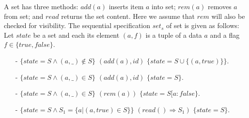 \begin{example}
\label{definition:sequential specification of set}
A set has three methods: $\mathit{add}(a)$ inserts item $a$ into set;
$\mathit{rem}(a)$ removes $a$ from set; and $\mathit{read}$ returns
the set content.
Here we assume that $\mathit{rem}$ will also be checked for
visibility.
The sequential specification $\mathit{set}_s$ of set is given as
follows:  Let $\mathit{state}$ be a set and each its element $(a,f)$
is a tuple of a data $a$ and a flag $f \in \{ \mathit{true},\mathit{false} \}$.
\begin{itemize}
\setlength{\itemsep}{0.5pt}
\item[-] $\{ \mathit{state} = S \wedge (a,\_) \notin S \}$
  $(\mathit{add}(a),\mathit{id})$ $\{ \mathit{state} = S \cup \{
  (a,\mathit{true}) \} \}$.
\item[-] $\{ \mathit{state} = S \wedge (a,\_) \in S \}$
  $(\mathit{add}(a),\mathit{id})$ $\{ \mathit{state} = S \}$.
\item[-] $\{ \mathit{state} = S \wedge (a,\_) \in S \}$
  $(\mathit{rem}(a))$ $\{ \mathit{state} = S[a: \mathit{false} \}$.
\item[-] $\{ \mathit{state} = S \wedge S_1 = \{a \vert
  (a,\mathit{true}) \in S \} \}$ $(\mathit{read}() \Rightarrow S_1)$
  $\{ \mathit{state} = S \}$.
\end{itemize}
\end{example}


